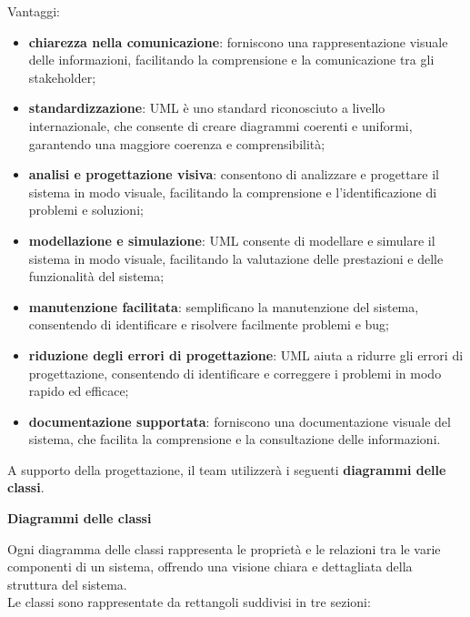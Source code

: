 Vantaggi:
\begin{itemize}
	\item \textbf{chiarezza nella comunicazione}: forniscono una rappresentazione visuale delle informazioni, facilitando la comprensione e la comunicazione tra gli stakeholder;
	\item \textbf{standardizzazione}: UML è uno standard riconosciuto a livello internazionale, che consente di creare diagrammi coerenti e uniformi, garantendo una maggiore coerenza e comprensibilità;
	\item \textbf{analisi e progettazione visiva}: consentono di analizzare e progettare il sistema in modo visuale, facilitando la comprensione e l'identificazione di problemi e soluzioni;
	\item \textbf{modellazione e simulazione}: UML consente di modellare e simulare il sistema in modo visuale, facilitando la valutazione delle prestazioni e delle funzionalità del sistema;
	\item \textbf{manutenzione facilitata}: semplificano la manutenzione del sistema, consentendo di identificare e risolvere facilmente problemi e bug;
	\item \textbf{riduzione degli errori di progettazione}: UML aiuta a ridurre gli errori di progettazione, consentendo di identificare e correggere i problemi in modo rapido ed efficace;
	\item \textbf{documentazione supportata}: forniscono una documentazione visuale del sistema, che facilita la comprensione e la consultazione delle informazioni.
\end{itemize}
A supporto della progettazione, il team utilizzerà i seguenti \textbf{diagrammi delle classi}.
\newpage
\begin{flushleft}
\textbf{Diagrammi delle classi}
\end{flushleft}
Ogni diagramma delle classi rappresenta le proprietà e le relazioni tra le varie componenti di un sistema, offrendo una visione chiara e dettagliata della struttura del sistema.\\
Le classi sono rappresentate da rettangoli suddivisi in tre sezioni:
